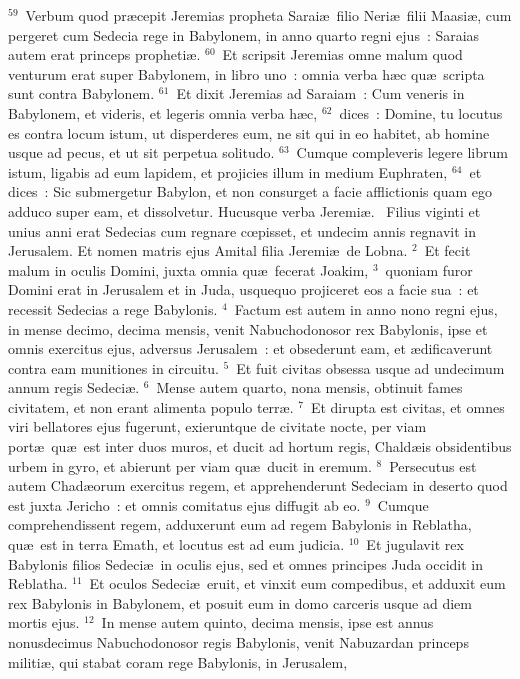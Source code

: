 ${}^{59}$~Verbum quod pr\ae cepit Jeremias propheta Sarai\ae\ filio Neri\ae\ filii Maasi\ae , cum pergeret cum Sedecia rege in Babylonem, in anno quarto regni ejus~: Saraias autem erat princeps propheti\ae .
${}^{60}$~Et scripsit Jeremias omne malum quod venturum erat super Babylonem, in libro uno~: omnia verba h\ae c qu\ae\ scripta sunt contra Babylonem.
${}^{61}$~Et dixit Jeremias ad Saraiam~: Cum veneris in Babylonem, et videris, et legeris omnia verba h\ae c,
${}^{62}$~dices~: Domine, tu locutus es contra locum istum, ut disperderes eum, ne sit qui in eo habitet, ab homine usque ad pecus, et ut sit perpetua solitudo.
${}^{63}$~Cumque compleveris legere librum istum, ligabis ad eum lapidem, et projicies illum in medium Euphraten,
${}^{64}$~et dices~: Sic submergetur Babylon, et non consurget a facie afflictionis quam ego adduco super eam, et dissolvetur. Hucusque verba Jeremi\ae .
~Filius viginti et unius anni erat Sedecias cum regnare cœpisset, et undecim annis regnavit in Jerusalem. Et nomen matris ejus Amital filia Jeremi\ae\ de Lobna.
${}^{2}$~Et fecit malum in oculis Domini, juxta omnia qu\ae\ fecerat Joakim,
${}^{3}$~quoniam furor Domini erat in Jerusalem et in Juda, usquequo projiceret eos a facie sua~: et recessit Sedecias a rege Babylonis.
${}^{4}$~Factum est autem in anno nono regni ejus, in mense decimo, decima mensis, venit Nabuchodonosor rex Babylonis, ipse et omnis exercitus ejus, adversus Jerusalem~: et obsederunt eam, et \ae dificaverunt contra eam munitiones in circuitu.
${}^{5}$~Et fuit civitas obsessa usque ad undecimum annum regis Sedeci\ae .
${}^{6}$~Mense autem quarto, nona mensis, obtinuit fames civitatem, et non erant alimenta populo terr\ae .
${}^{7}$~Et dirupta est civitas, et omnes viri bellatores ejus fugerunt, exieruntque de civitate nocte, per viam port\ae\ qu\ae\ est inter duos muros, et ducit ad hortum regis, Chald\ae is obsidentibus urbem in gyro, et abierunt per viam qu\ae\ ducit in eremum.
${}^{8}$~Persecutus est autem Chad\ae orum exercitus regem, et apprehenderunt Sedeciam in deserto quod est juxta Jericho~: et omnis comitatus ejus diffugit ab eo.
${}^{9}$~Cumque comprehendissent regem, adduxerunt eum ad regem Babylonis in Reblatha, qu\ae\ est in terra Emath, et locutus est ad eum judicia.
${}^{10}$~Et jugulavit rex Babylonis filios Sedeci\ae\ in oculis ejus, sed et omnes principes Juda occidit in Reblatha.
${}^{11}$~Et oculos Sedeci\ae\ eruit, et vinxit eum compedibus, et adduxit eum rex Babylonis in Babylonem, et posuit eum in domo carceris usque ad diem mortis ejus.
${}^{12}$~In mense autem quinto, decima mensis, ipse est annus nonusdecimus Nabuchodonosor regis Babylonis, venit Nabuzardan princeps militi\ae , qui stabat coram rege Babylonis, in Jerusalem,
